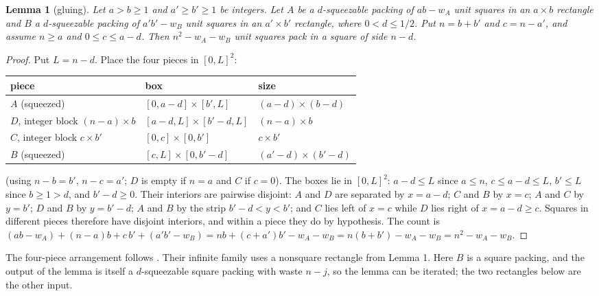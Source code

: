 \documentclass[11pt,letterpaper]{amsart}
\theoremstyle{plain}
\newtheorem{lemma}[theorem]{Lemma}
\begin{document}
\begin{lemma}[gluing]
Let $a > b \ge 1$ and $a' \ge b' \ge 1$ be integers. Let $A$ be a $d$-squeezable packing of $ab - w_A$ unit squares in an $a \times b$ rectangle and $B$ a $d$-squeezable packing of $a'b' - w_B$ unit squares in an $a' \times b'$ rectangle, where $0 < d \le 1/2$. Put $n = b + b'$ and $c = n - a'$, and assume $n \ge a$ and $0 \le c \le a - d$. Then $n^2 - w_A - w_B$ unit squares pack in a square of side $n - d$.
\end{lemma}

\begin{proof}
Put $L = n - d$. Place the four pieces in $[0, L]^2$:

\begin{center}
\begin{tabular}{lll}
\toprule
piece & box & size \\
\midrule
$A$ (squeezed) & $[0, a - d] \times [b', L]$ & $(a - d) \times (b - d)$ \\
$D$, integer block $(n - a) \times b$ & $[a - d, L] \times [b' - d, L]$ & $(n - a) \times b$ \\
$C$, integer block $c \times b'$ & $[0, c] \times [0, b']$ & $c \times b'$ \\
$B$ (squeezed) & $[c, L] \times [0, b' - d]$ & $(a' - d) \times (b' - d)$ \\
\bottomrule
\end{tabular}
\end{center}

(using $n - b = b'$, $n - c = a'$; $D$ is empty if $n = a$ and $C$ if $c = 0$). The boxes lie in $[0, L]^2$: $a - d \le L$ since $a \le n$, $c \le a - d \le L$, $b' \le L$ since $b \ge 1 > d$, and $b' - d \ge 0$. Their interiors are pairwise disjoint: $A$ and $D$ are separated by $x = a - d$; $C$ and $B$ by $x = c$; $A$ and $C$ by $y = b'$; $D$ and $B$ by $y = b' - d$; $A$ and $B$ by the strip $b' - d < y < b'$; and $C$ lies left of $x = c$ while $D$ lies right of $x = a - d \ge c$. Squares in different pieces therefore have disjoint interiors, and within a piece they do by hypothesis. The count is $(ab - w_A) + (n-a)b + c\,b' + (a'b' - w_B) = nb + (c + a')b' - w_A - w_B = n(b + b') - w_A - w_B = n^2 - w_A - w_B$.
\end{proof}

The four-piece arrangement follows \cite[Figure 1]{AMS21}. Their infinite family uses a nonsquare rectangle from Lemma 1. Here $B$ is a square packing, and the output of the lemma is itself a $d$-squeezable square packing with waste $n - j$, so the lemma can be iterated; the two rectangles below are the other input.
\end{document}
